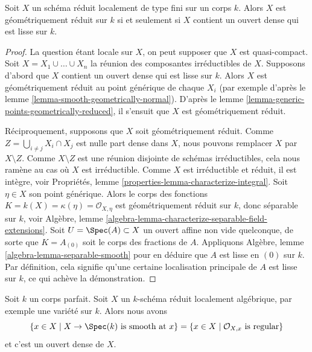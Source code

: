 \begin{lemma}
\label{lemma-geometrically-reduced-dense-smooth-open}
 Soit $X$ un schéma réduit localement de type fini sur un corps $k$.
Alors $X$ est géométriquement réduit sur $k$ si et seulement si 
$X$ contient un ouvert dense qui est lisse sur $k$. 
\end{lemma}

\begin{proof}
 La question étant locale sur $X$, on peut supposer que $X$ est quasi-compact. Soit 
$X = X_1 \cup \ldots \cup X_n$ la réunion des composantes irréductibles de $X$.
Supposons d'abord que $X$ contient un ouvert dense qui est lisse sur $k$.
Alors $X$ est géométriquement réduit au point générique de chaque $X_i$
 (par exemple d'après le lemme \ref{lemma-smooth-geometrically-normal}).
D'après le lemme \ref{lemma-generic-points-geometrically-reduced},
il s'ensuit que $X$ est géométriquement réduit.

\medskip\noindent
 Réciproquement, supposons que $X$ soit géométriquement réduit.
Comme $Z = \bigcup_{i \not = j} X_i \cap X_j$ est nulle part dense dans $X$,
nous pouvons remplacer $X$ par $X \setminus Z$. Comme $X \setminus Z$ est
une réunion disjointe de schémas irréductibles, cela nous ramène au cas
où $X$ est irréductible. Comme $X$ est irréductible et réduit, il
est intègre,
voir Propriétés, lemme \ref{properties-lemma-characterize-integral}.
Soit $\eta \in X$ son point générique.
Alors le corps des fonctions $K = k(X) = \kappa(\eta) = \mathcal{O}_{X, \eta}$
 est géométriquement réduit sur $k$, donc séparable sur $k$,
voir Algèbre, lemme \ref{algebra-lemma-characterize-separable-field-extensions}.
Soit $U = \Spec(A) \subset X$ un ouvert affine non vide quelconque, de
sorte que $K = A_{(0)}$ soit le corps des fractions de $A$.
Appliquons Algèbre, lemme \ref{algebra-lemma-separable-smooth}
 pour en déduire que $A$ est lisse en $(0)$ sur $k$.
Par définition, cela signifie qu'une certaine localisation principale de 
$A$ est lisse sur $k$, ce qui achève la démonstration. 
\end{proof}

\begin{lemma}
\label{lemma-dense-smooth-open-variety-over-perfect-field}
 Soit $k$ un corps parfait. Soit $X$
un $k$-schéma réduit localement algébrique, par exemple une variété sur $k$. Alors nous avons 
$$
\{x \in X \mid X \to \Spec(k)\text{ is smooth at }x\} =
\{x \in X \mid \mathcal{O}_{X, x}\text{ is regular}\}
$$
 et c'est un ouvert dense de $X$. 
\end{lemma}

